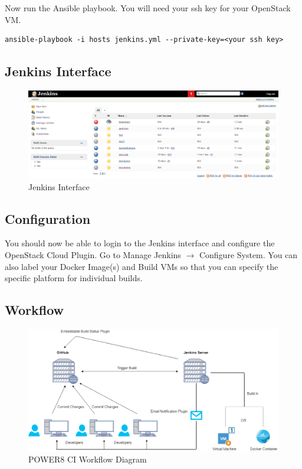 \documentclass[10pt,letterpaper,onecolumn,draftclsnofoot]{IEEEtran}
\begin{document}
Now run the Ansible playbook. You will need your ssh key for your OpenStack VM.

\begin{verbatim}
ansible-playbook -i hosts jenkins.yml --private-key=<your ssh key>
\end{verbatim}
\subsection{Jenkins Interface}
\begin{figure}[H]
  \includegraphics[width=\textwidth]{images/jenkins.eps}
  \caption{Jenkins Interface}
\end{figure}
\subsection{Configuration}

You should now be able to login to the Jenkins interface and configure the OpenStack Cloud Plugin.
Go to Manage Jenkins $\rightarrow$ Configure System. You can also label your Docker Image(s) and Build VMs so that you can specify the specific platform for individual builds.
\subsection{Workflow}
\begin{figure}[H]
  \includegraphics[width=\textwidth]{images/workflow.eps}
  \caption{POWER8 CI Workflow Diagram}
\end{figure}
\end{document}
